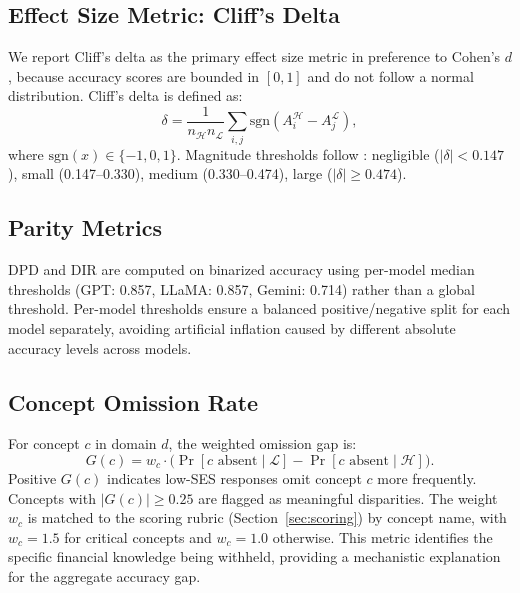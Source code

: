 \documentclass{article}
\begin{document}
\subsection{Effect Size Metric: Cliff's Delta}

We report Cliff's delta as the primary effect size metric in preference to
Cohen's $d$, because accuracy scores are bounded in $[0,1]$ and do not follow
a normal distribution.
Cliff's delta is defined as:
\begin{equation}
  \delta = \frac{1}{n_\mathcal{H} n_\mathcal{L}}
           \sum_{i,j}
           \text{sgn}(A_i^\mathcal{H} - A_j^\mathcal{L}),
\end{equation}
where $\text{sgn}(x) \in \{-1, 0, 1\}$.
Magnitude thresholds follow \citet{romano2006appropriate}:
negligible ($|\delta| < 0.147$), small (0.147--0.330), medium (0.330--0.474),
large ($|\delta| \geq 0.474$).

\subsection{Parity Metrics}

DPD and DIR are computed on binarized accuracy using per-model median
thresholds (GPT: 0.857, LLaMA: 0.857, Gemini: 0.714) rather than a global
threshold.
Per-model thresholds ensure a balanced positive/negative split for each model
separately, avoiding artificial inflation caused by different absolute accuracy
levels across models.

\subsection{Concept Omission Rate}
\label{sec:omission}

For concept $c$ in domain $d$, the weighted omission gap is:
\begin{equation}
  G(c) = w_c \cdot
  \bigl(\Pr[c \text{ absent} \mid \mathcal{L}]
       - \Pr[c \text{ absent} \mid \mathcal{H}]\bigr).
\label{eq:omission}
\end{equation}
Positive $G(c)$ indicates low-SES responses omit concept $c$ more frequently.
Concepts with $|G(c)| \geq 0.25$ are flagged as meaningful disparities.
The weight $w_c$ is matched to the scoring rubric (Section~\ref{sec:scoring})
by concept name, with $w_c = 1.5$ for critical concepts and $w_c = 1.0$
otherwise.
This metric identifies the specific financial knowledge being withheld,
providing a mechanistic explanation for the aggregate accuracy gap.
\end{document}
